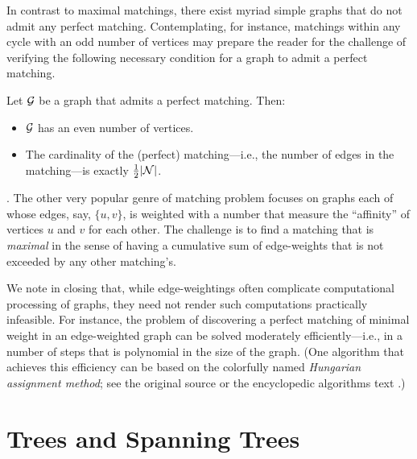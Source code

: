 \medskip

In contrast to maximal matchings, there exist myriad simple graphs that do not admit any perfect matching.  Contemplating, for instance, matchings within any cycle with an odd number of vertices may prepare the reader for the challenge of verifying the following necessary condition for a graph to admit a perfect matching.

\begin{prop}
\label{thm:necessary-for-perfect-matching}
Let $\mbox{$\cal G$}$ be a graph that admits a perfect matching.  Then:
\begin{itemize}
\item
$\mbox{$\cal G$}$ has an even number of vertices.
\medskip\item
The cardinality of the (perfect) matching---i.e., the number of edges in the matching---is exactly
$\frac{1}{2}|\mbox{$\cal N$}|$.
\end{itemize}
\end{prop}

\bigskip


.
The other very popular genre of matching problem focuses on graphs each of whose edges, say, $\{u,v\}$, is weighted with a number that measure the ``affinity'' of  vertices $u$ and $v$ for each other.  The challenge is to find a matching that is {\em maximal} in the sense of having a cumulative sum of edge-weights that is not exceeded by any other matching's.

\smallskip


We note in closing that, while edge-weightings often complicate computational processing of graphs, they need not render such computations practically infeasible.  For instance, the problem of discovering a perfect matching of minimal weight in an edge-weighted graph can be solved moderately efficiently---i.e., in a number of steps that is polynomial in the size of the graph.  (One algorithm that achieves this efficiency can be based on the colorfully named {\it Hungarian assignment method}; see the original source \cite{Kuhn55} or the encyclopedic algorithms text \cite{CLRS}.)



\section{Trees and Spanning Trees}
\label{sec:Trees}

